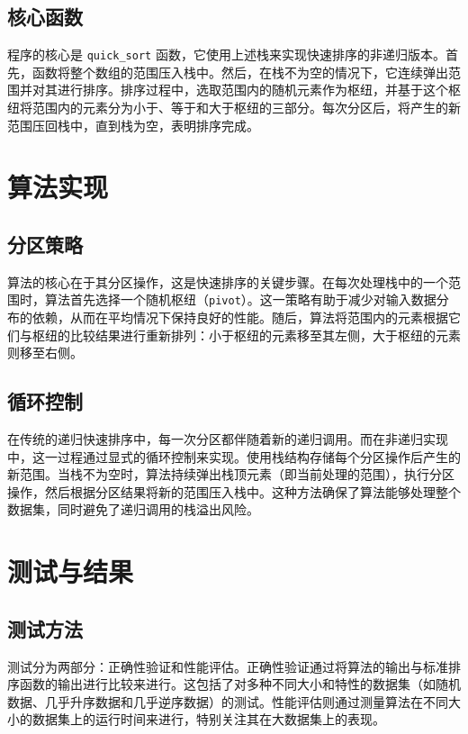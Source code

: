 \documentclass[12pt]{article}
\begin{document}
\subsection{核心函数}

程序的核心是 \verb|quick_sort| 函数，它使用上述栈来实现快速排序的非递归版本。首先，函数将整个数组的范围压入栈中。然后，在栈不为空的情况下，它连续弹出范围并对其进行排序。排序过程中，选取范围内的随机元素作为枢纽，并基于这个枢纽将范围内的元素分为小于、等于和大于枢纽的三部分。每次分区后，将产生的新范围压回栈中，直到栈为空，表明排序完成。

\section{算法实现}

\subsection{分区策略}

算法的核心在于其分区操作，这是快速排序的关键步骤。在每次处理栈中的一个范围时，算法首先选择一个随机枢纽（\verb|pivot|）。这一策略有助于减少对输入数据分布的依赖，从而在平均情况下保持良好的性能。随后，算法将范围内的元素根据它们与枢纽的比较结果进行重新排列：小于枢纽的元素移至其左侧，大于枢纽的元素则移至右侧。

\subsection{循环控制}

在传统的递归快速排序中，每一次分区都伴随着新的递归调用。而在非递归实现中，这一过程通过显式的循环控制来实现。使用栈结构存储每个分区操作后产生的新范围。当栈不为空时，算法持续弹出栈顶元素（即当前处理的范围），执行分区操作，然后根据分区结果将新的范围压入栈中。这种方法确保了算法能够处理整个数据集，同时避免了递归调用的栈溢出风险。

\newpage

\section{测试与结果}

\subsection{测试方法}

测试分为两部分：正确性验证和性能评估。正确性验证通过将算法的输出与标准排序函数的输出进行比较来进行。这包括了对多种不同大小和特性的数据集（如随机数据、几乎升序数据和几乎逆序数据）的测试。性能评估则通过测量算法在不同大小的数据集上的运行时间来进行，特别关注其在大数据集上的表现。
\end{document}
